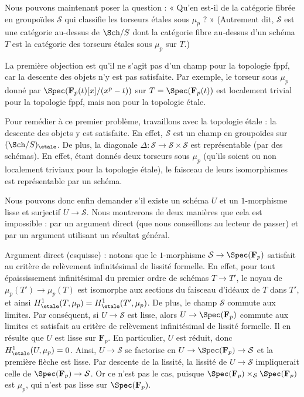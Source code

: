 \medskip\noindent
Nous pouvons maintenant poser la question : « Qu'en est-il de la catégorie fibrée en groupoïdes
$\mathcal{S}$ qui classifie les torseurs étales sous $\mu_p$ ? » (Autrement dit,
$\mathcal{S}$ est une catégorie au-dessus de $\Sch/S$ dont la catégorie fibre au-dessus d'un
schéma $T$ est la catégorie des torseurs étales sous $\mu_p$ sur $T$.)

\medskip\noindent
La première objection est qu'il ne s'agit pas d'un champ pour la topologie fppf,
car la descente des objets n'y est pas satisfaite. Par exemple, le
torseur sous $\mu_p$ donné par $\Spec(\mathbf{F}_p(t)[x]/(x^p - t))$ sur
$T = \Spec(\mathbf{F}_p(t))$ est localement trivial pour la topologie fppf, mais
non pour la topologie étale.

\medskip\noindent
Pour remédier à ce premier problème, travaillons avec la topologie étale :
la descente des objets y est satisfaite. En effet,
$\mathcal{S}$ est un champ en groupoïdes sur $(\Sch/S)_\etale$.
De plus, la diagonale
$\Delta : \mathcal{S} \to \mathcal{S} \times \mathcal{S}$
est représentable (par des schémas). En effet, étant donnés deux
torseurs sous $\mu_p$ (qu'ils soient ou non localement triviaux pour la topologie étale),
le faisceau de leurs isomorphismes est représentable par un schéma.

\medskip\noindent
Nous pouvons donc enfin demander s'il existe un schéma $U$ et un
$1$-morphisme lisse et surjectif $U \to \mathcal{S}$. Nous montrerons de deux
manières que cela est impossible : par un argument direct (que nous conseillons
au lecteur de passer) et par un argument utilisant un résultat général.

\medskip\noindent
Argument direct (esquisse) : notons que le $1$-morphisme
$\mathcal{S} \to \Spec(\mathbf{F}_p)$ satisfait au
critère de relèvement infinitésimal de lissité formelle.
En effet, pour tout épaississement infinitésimal du premier ordre
de schémas $T \to T'$, le noyau de $\mu_p(T') \to \mu_p(T)$
est isomorphe aux sections du faisceau d'idéaux de $T$ dans $T'$, et
ainsi $H^1_\etale(T, \mu_p) = H^1_\etale(T', \mu_p)$.
De plus, le champ $\mathcal{S}$ commute aux limites. Par conséquent,
si $U \to \mathcal{S}$ est lisse, alors $U \to \Spec(\mathbf{F}_p)$
commute aux limites et satisfait au
critère de relèvement infinitésimal de lissité formelle.
Il en résulte que $U$ est lisse sur $\mathbf{F}_p$.
En particulier, $U$ est réduit, donc $H^1_\etale(U, \mu_p) = 0$.
Ainsi, $U \to \mathcal{S}$ se factorise en
$U \to \Spec(\mathbf{F}_p) \to \mathcal{S}$
et la première flèche est lisse. Par descente de la lissité,
la lissité de $U \to \mathcal{S}$ impliquerait celle de
$\Spec(\mathbf{F}_p) \to \mathcal{S}$. Or ce n'est
pas le cas, puisque
$\Spec(\mathbf{F}_p) \times_\mathcal{S} \Spec(\mathbf{F}_p)$
est $\mu_p$, qui n'est pas lisse sur $\Spec(\mathbf{F}_p)$.


